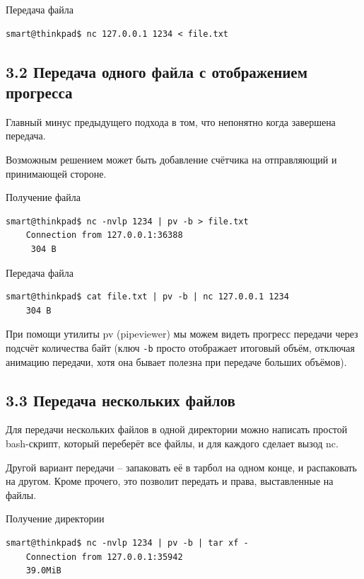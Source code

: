 Передача файла
\begin{Verbatim}[frame=single]
    smart@thinkpad$ nc 127.0.0.1 1234 < file.txt

\end{Verbatim}

\subsection*{3.2 Передача одного файла с отображением прогресса}

Главный минус предыдущего подхода в том, что непонятно когда завершена передача.

Возможным решением может быть добавление счётчика на отправляющий и принимающей стороне.

Получение файла
\begin{Verbatim}[frame=single]
    smart@thinkpad$ nc -nvlp 1234 | pv -b > file.txt
    Connection from 127.0.0.1:36388
     304 B
\end{Verbatim}

Передача файла
\begin{Verbatim}[frame=single]
    smart@thinkpad$ cat file.txt | pv -b | nc 127.0.0.1 1234
    304 B
\end{Verbatim}

При помощи утилиты pv (pipeviewer) мы можем видеть прогресс передачи через подсчёт количества байт (ключ \texttt{-b} просто отображает итоговый объём, отключая анимацию передачи, хотя она бывает полезна при передаче больших объёмов).

\subsection*{3.3 Передача нескольких файлов}

Для передачи нескольких файлов в одной директории можно написать простой bash-скрипт, который переберёт все файлы, и для каждого сделает вызод nc.

Другой вариант передачи -- запаковать её в тарбол на одном конце, и распаковать на другом. Кроме прочего, это позволит передать и права, выставленные на файлы.

Получение директории
\begin{Verbatim}[frame=single]
    smart@thinkpad$ nc -nvlp 1234 | pv -b | tar xf -
    Connection from 127.0.0.1:35942
    39.0MiB
\end{Verbatim}

